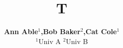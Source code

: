 \documentclass{article}
\begin{document}
\title{T}
\author{\textbf{Ann Able$^{1}$,\quad Bob Baker$^{2}$,\quad Cat Cole$^{1}$}\vspace{3pt} \\
$^1$Univ A \quad $^2$Univ B}
\maketitle
\end{document}
